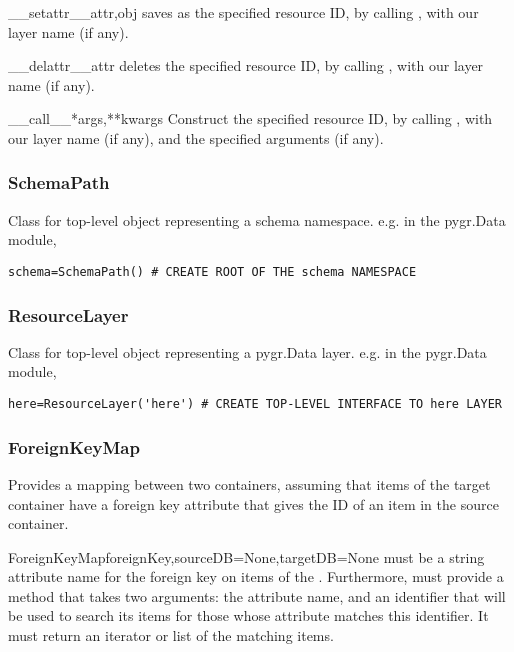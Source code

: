 \documentclass{howto}
\begin{document}
\begin{funcdesc}{__setattr__}{attr,obj}
  saves  as the specified resource ID, by calling
  , with our layer name (if any).
\end{funcdesc}

\begin{funcdesc}{__delattr__}{attr}
  deletes the specified resource ID, by calling
  , with our layer name (if any).
\end{funcdesc}

\begin{funcdesc}{__call__}{*args,**kwargs}
  Construct the specified resource ID, by calling ,
  with our layer name (if any), and the specified arguments (if any).
\end{funcdesc}

\subsubsection{SchemaPath}
Class for top-level object representing a schema namespace.  e.g. in the pygr.Data
module,
\begin{verbatim}
schema=SchemaPath() # CREATE ROOT OF THE schema NAMESPACE
\end{verbatim}

\subsubsection{ResourceLayer}
Class for top-level object representing a pygr.Data layer.  e.g. in the pygr.Data
module,
\begin{verbatim}
here=ResourceLayer('here') # CREATE TOP-LEVEL INTERFACE TO here LAYER
\end{verbatim}

\subsubsection{ForeignKeyMap}
Provides a mapping between two containers, assuming that items of the target
container have a foreign key attribute that gives the ID of an item in the source
container.
\begin{funcdesc}{ForeignKeyMap}{foreignKey,sourceDB=None,targetDB=None}
   must be a string attribute name for the foreign key on
  items of the .  Furthermore,  must provide
  a  method that takes two arguments: the  attribute name,
  and an identifier that will be used to search its items for those whose attribute
  matches this identifier.  It must return an iterator or list of the matching items.
\end{funcdesc}
\end{document}
